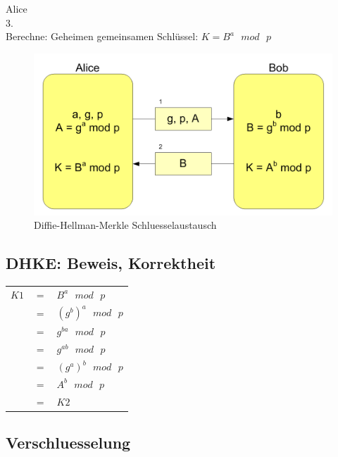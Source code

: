 \documentclass[
  a4paper,
  11pt,
]{article}
\begin{document}
	Alice\\
	3.\\
	Berechne:	Geheimen gemeinsamen Schlüssel: $K=B^a\text{ }mod\text{ }p$\\

\begin{figure}[H]
	\centering
	\includegraphics[width=\textwidth]{Diffie-Hellman-Schluesselaustausch2.png}
	\caption{Diffie-Hellman-Merkle Schluesselaustausch}
	\label{img:grafik-dummy}
\end{figure}

\subsection*{DHKE: Beweis, Korrektheit}
\label{sub:DHKE: Beweis, Korrektheit}

\begin{center}
\begin{tabular}{rcl}
	$K1$	&	$=$ &	$B^a\text{ }mod\text{ }p$\\
			&	$=$	&	$(g^b)^a\text{ }mod\text{ }p$\\
			&	$=$	&	$g^{ba}\text{ }mod\text{ }p$\\
			&	$=$	&	$g^{ab}\text{ }mod\text{ }p$\\
			&	$=$	&	$(g^a)^b\text{ }mod\text{ }p$\\
			&	$=$	&	$A^b\text{ }mod\text{ }p$\\
			&	$=$	&	$K2$\\
\end{tabular}
\end{center}

\subsection*{Verschluesselung}
\label{sub:Verschluesselung}
\end{document}
